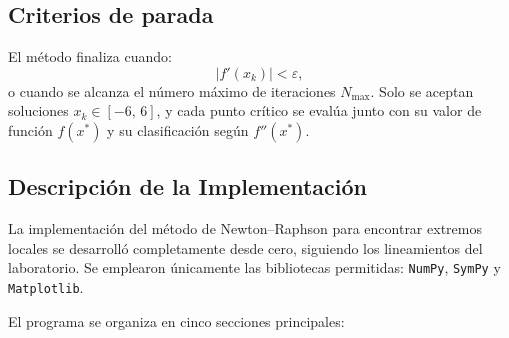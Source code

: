 \documentclass{article}
\begin{document}
\subsection{Criterios de parada}
El método finaliza cuando:
\[
|f'(x_k)| < \varepsilon,
\]
o cuando se alcanza el número máximo de iteraciones \(N_{\text{max}}\).
Solo se aceptan soluciones \(x_k \in [-6,\,6]\), y cada punto crítico se evalúa junto con su valor de función \(f(x^*)\) y su clasificación según \(f''(x^*)\).


\subsection{Descripción de la Implementación}

La implementación del método de Newton--Raphson para encontrar extremos locales
se desarrolló completamente desde cero, siguiendo los lineamientos del laboratorio.
Se emplearon únicamente las bibliotecas permitidas: \texttt{NumPy}, \texttt{SymPy} y \texttt{Matplotlib}.

El programa se organiza en cinco secciones principales:
\end{document}
